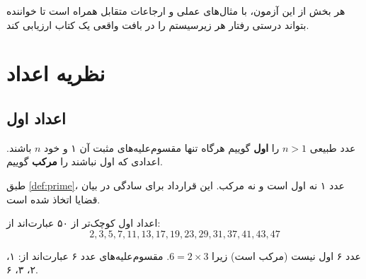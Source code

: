 \documentclass{matinbook}
\begin{document}
هر بخش از این آزمون، با مثال‌های عملی و ارجاعات متقابل
همراه است تا خواننده بتواند درستی رفتار هر زیرسیستم را
در بافت واقعی یک کتاب ارزیابی کند.

\clearpage

\tableofcontents
\clearpage

\listoffigures
\clearpage

\listoftables
\clearpage

\mainmatter
\mainmattergeometry

\chapter{نظریه اعداد}
\label{chap:numbertheory}

\section{اعداد اول}
\label{sec:numbertheory-primes}

\begin{definition}
    عدد طبیعی $n > 1$ را \textbf{اول} گوییم
    هرگاه تنها مقسوم‌علیه‌های مثبت آن ۱ و خود $n$ باشند.
    اعدادی که اول نباشند را \textbf{مرکب} گوییم.
    \label{def:prime}
\end{definition}

طبق \cref{def:prime}، عدد ۱ نه اول است و نه مرکب. این
قرارداد برای سادگی در بیان قضایا اتخاذ شده است.


\begin{example}
    اعداد اول کوچک‌تر از ۵۰ عبارت‌اند از:
    \[
    2, 3, 5, 7, 11, 13, 17, 19, 23, 29, 31, 37, 41, 43, 47
    \]
    \label{ex:primes-under-50}
\end{example}

\begin{example}
    عدد ۶ اول نیست (مرکب است) زیرا $6 = 2 \times 3$.
    مقسوم‌علیه‌های عدد ۶ عبارت‌اند از: ۱، ۲، ۳، ۶.
    \label{ex:not-prime}
\end{example}
\end{document}
